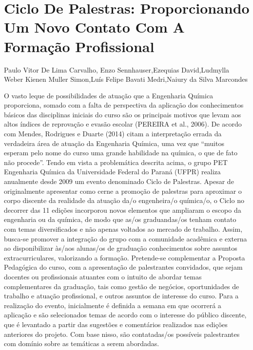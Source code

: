 
\section*{Ciclo De Palestras: Proporcionando Um Novo Contato Com A Formação Profissional}

Paulo Vitor De Lima Carvalho, Enzo Sennhauser,Ezequias David,Ludmylla Weber Kienen Muller Simon,Luís Felipe Bavati Medri,Naiury da Silva Marcondes

O vasto leque de possibilidades de atuação que a Engenharia Química proporciona, somado 
com a falta de perspectiva da aplicação dos conhecimentos básicos das disciplinas iniciais do curso 
são os principais motivos que levam aos altos índices de reprovação e evasão escolar (PEREIRA 
et al., 2006).
De acordo com Mendes, Rodrigues e Duarte (2014) citam a interpretação errada da 
verdadeira área de atuação da Engenharia Química, uma vez que “muitos esperam pelo nome do 
curso uma grande habilidade na química, o que de fato não procede”.
Tendo em vista a problemática descrita acima, o grupo PET Engenharia Química da 
Universidade Federal do Paraná (UFPR) realiza anualmente desde 2009 um evento denominado 
Ciclo de Palestras. Apesar de originalmente apresentar como cerne a promoção de palestras para 
aproximar o corpo discente da realidade da atuação da/o engenheira/o química/o, o Ciclo no 
decorrer das 11 edições incorporou novos elementos que ampliaram o escopo da engenharia ou da 
química, de modo que as/os graduandas/os tenham contato com temas diversificados e não apenas 
voltados ao mercado de trabalho.
Assim, busca-se promover a integração do grupo com a comunidade acadêmica e externa 
ao disponibilizar às/aos alunas/os de graduação conhecimentos sobre assuntos extracurriculares, 
valorizando a formação. Pretende-se complementar a Proposta Pedagógica do curso, com a 
apresentação de palestrantes convidados, que sejam docentes ou profissionais atuantes com o 
intuito de abordar temas complementares da graduação, tais como gestão de negócios, 
oportunidades de trabalho e atuação profissional, e outros assuntos de interesse do curso.
Para a realização do evento, inicialmente é definida a semana em que ocorrerá a aplicação 
e são selecionados temas de acordo com o interesse do público discente, que é levantado a partir 
das sugestões e comentários realizados nas edições anteriores do projeto. Com base nisso, são 
contatadas/os possíveis palestrantes com domínio sobre as temáticas a serem abordadas.
